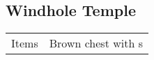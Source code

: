 \subsection{Windhole Temple}
\label{map:windhole_temple}

\noindent\begin{tabularx}{\textwidth}[l]{lX}
	Items & Brown chest with \nameref{item:heal_potion}s
\end{tabularx}
